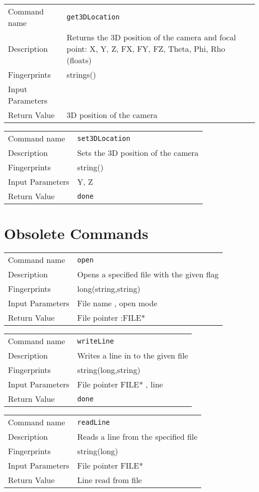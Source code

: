 \noindent
\begin{tabular}{l|p{5in}}
\hline
Command name &{\tt get3DLocation }\\ 
Description &
 Returns the 3D position of the camera and focal point: X, Y, Z, FX, FY, FZ, Theta, Phi, Rho (floats) 
 	\\
Fingerprints & strings()\\
Input Parameters&\\
Return Value& 3D position of the camera\\
\hline
\end{tabular}
\bigskip

\noindent
\begin{tabular}{l|p{5in}}
\hline
Command name &{\tt set3DLocation }\\ 
Description &
 Sets the 3D position of the camera 
 	\\
Fingerprints & string()\\
Input Parameters& Y, Z \\
Return Value&{\tt done}\\
\hline
\end{tabular}
\bigskip


\section{Obsolete Commands}
\noindent
\begin{tabular}{l|p{5in}}
\hline
Command name &{\tt open }\\ 
Description &
 Opens a specified file with the given flag 
 	\\
Fingerprints & long(string,string)\\
Input Parameters& File name , open mode \\
Return Value& File pointer :FILE*\\
\hline
\end{tabular}
\bigskip

\noindent
\begin{tabular}{l|p{5in}}
\hline
Command name &{\tt writeLine }\\ 
Description &
 Writes a line in to the given file 
 	\\
Fingerprints & string(long,string)\\
Input Parameters& File pointer FILE* , line \\
Return Value&{\tt done}\\
\hline
\end{tabular}
\bigskip

\noindent
\begin{tabular}{l|p{5in}}
\hline
Command name &{\tt readLine }\\ 
Description &
 Reads a line from the specified file 
 	\\
Fingerprints & string(long)\\
Input Parameters& File pointer FILE* \\
Return Value& Line read from file \\
\hline
\end{tabular}
\bigskip


